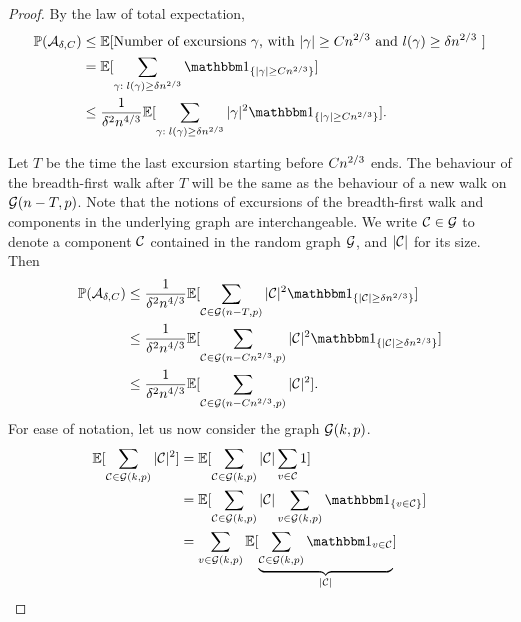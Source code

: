 \begin{proof}
	By the law of total expectation,
	\begin{align*}
	\Prob(\ExcursionEvent) 
	&\leq \Exp{ \text{Number of excursions $\gamma$, with $|\gamma| \geq C\n{2}{3}$ and $l(\gamma) \geq \delta\n{2}{3}$ } } \\
	&= \Exp{ \sum_{\gamma: \; l(\gamma) \geq \delta\n{2}{3}} \Ind{\{|\gamma| \geq C\n{2}{3} \} } } \\
	&\leq \frac{1}{\delta^2\n{4}{3}} \Exp{ \sum_{\gamma: \; l(\gamma) \geq \delta\n{2}{3}}  |\gamma|^2 \Ind{\{|\gamma| \geq C\n{2}{3} \} }}.
	\end{align*}
	
	Let $T$ be the time the last excursion starting before $Cn^{2 / 3}$ ends.
	The behaviour of the breadth-first walk after $T$ will be the same as the behaviour of a new walk on $\mathcal{G}(n-T,p)$.
	Note that the notions of excursions of the breadth-first walk and components in the underlying graph are interchangeable.
	We write $\mathcal{C} \in \mathcal{G}$ to denote a component $\mathcal{C}$ contained in the random graph $\mathcal{G}$,
	and $|\mathcal{C}|$ for its size.
	Then
	\begin{equation} \label{E: P(ExcEvent) 2}
	\begin{aligned}
	\Prob(\ExcursionEvent) 
	&\leq \frac{1}{\delta^2\n{4}{3}} \Exp{ \sum_{\Ccal \in \Gcal(n-T, p)}  |\Ccal|^2 \Ind{\{|\Ccal| \geq \delta\n{2}{3} \} }} \\
	&\leq \frac{1}{\delta^2\n{4}{3}} \Exp{ \sum_{\Ccal \in \Gcal(n-C\n{2}{3}, p)}  |\Ccal|^2 \Ind{\{|\Ccal| \geq \delta\n{2}{3} \} }} \\
	&\leq \frac{1}{\delta^2\n{4}{3}} \Exp{ \sum_{\Ccal \in \Gcal(n-C\n{2}{3}, p)}  |\Ccal|^2 }.
	\end{aligned}
	\end{equation}
	For ease of notation,
	let us now consider the graph $\mathcal{G}(k,p)$.
	\begin{equation} \label{E: P(ExcEvent) 3}
	\begin{aligned}
	\Exp{\sum_{\Ccal \in \Gcal(k, p)} |\Ccal|^2 } 
	&= \Exp{ \sum_{\Ccal \in \Gcal(k, p)} |\Ccal| \sum_{v \in \Ccal} 1} \\
	&= \Exp{ \sum_{\Ccal \in \Gcal(k, p)} |\Ccal| \sum_{v \in \Gcal(k,p)} \Ind{\{v \in \Ccal\}} } \\
	&= \sum_{v \in \Gcal(k,p)} \Exp{ \underbrace{\sum_{\Ccal \in \Gcal(k, p)} \Ind{v \in \Ccal}}_{|\Ccal|} } \\ 

\end{aligned}
\end{equation}
\end{proof}
